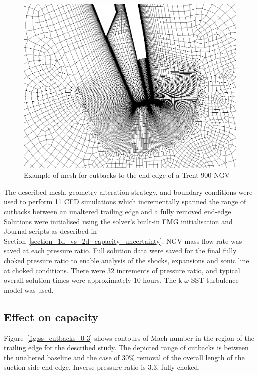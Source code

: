\documentclass[a4paper, 11pt, oneside]{report}
\begin{document}
\begin{figure}[H]
      \centering
      \includegraphics[width=.9\textwidth]{figs/T900_ss_cutbacks_mesh.png}
      \caption{Example of mesh for cutbacks to the end-edge of a Trent 900 NGV}
      \label{fig:T900_ss_cutbacks_mesh}
\end{figure}

The described mesh, geometry alteration strategy, and boundary conditions were used to perform 11 CFD simulations which incrementally spanned the range of cutbacks between an unaltered trailing edge and a fully removed end-edge. Solutions were initialised using the solver's built-in FMG initialisation and Journal scripts as described in Section~\ref{section_1d_vs_2d_capacity_uncertainty}. NGV mass flow rate was saved at each pressure ratio. Full solution data were saved for the final fully choked pressure ratio to enable analysis of the shocks, expansions and sonic line at choked conditions. There were 32 increments of pressure ratio, and typical overall solution times were approximately 10 hours. The k-$\omega$ SST turbulence model was used.

\subsection{Effect on capacity}

Figure~\ref{fig:ss_cutbacks_0-3} shows contours of Mach number in the region of the trailing edge for the described study. The depicted range of cutbacks is between the unaltered baseline and the case of $30\%$ removal of the overall length of the suction-side end-edge. Inverse pressure ratio is $3.3$, fully choked.
\end{document}
